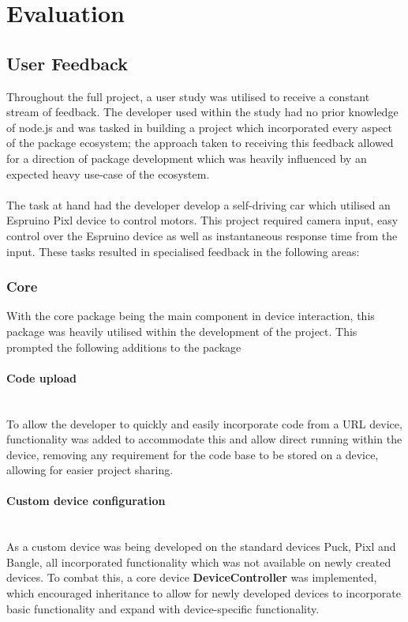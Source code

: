 \documentclass{l4proj}
\begin{document}
\chapter{Evaluation} 

\section{User Feedback}
Throughout the full project, a user study was utilised to receive a constant stream of feedback. The developer used within the study had no prior knowledge of node.js and was tasked in building a project which incorporated every aspect of the package ecosystem; the approach taken to receiving this feedback allowed for a direction of package development which was heavily influenced by an expected heavy use-case of the ecosystem.
\\ \\
The task at hand had the developer develop a self-driving car which utilised an Espruino Pixl device to control motors. This project required camera input, easy control over the Espruino device as well as instantaneous response time from the input. These tasks resulted in specialised feedback in the following areas:

\subsection{Core}
With the core package being the main component in device interaction, this package was heavily utilised within the development of the project. This prompted the following additions to the package

\subsubsection{Code upload}\hfill\\
To allow the developer to quickly and easily incorporate code from a URL device, functionality was added to accommodate this and allow direct running within the device, removing any requirement for the code base to be stored on a device, allowing for easier project sharing.
\subsubsection{Custom device configuration}\hfill\\
As a custom device was being developed on the standard devices Puck, Pixl and Bangle, all incorporated functionality which was not available on newly created devices. To combat this, a core device \textbf{DeviceController} was implemented, which encouraged inheritance to allow for newly developed devices to incorporate basic functionality and expand with device-specific functionality.
\end{document}
